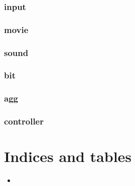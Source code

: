 \documentclass[letterpaper,10pt,english]{sphinxmanual}
\begin{document}
\subsection{input}
\label{\detokenize{mods:input}}\label{\detokenize{mods:id7}}

\subsection{movie}
\label{\detokenize{mods:movie}}\label{\detokenize{mods:id8}}

\subsection{sound}
\label{\detokenize{mods:sound}}\label{\detokenize{mods:id9}}

\subsection{bit}
\label{\detokenize{mods:bit}}\label{\detokenize{mods:id10}}

\subsection{agg}
\label{\detokenize{mods:agg}}\label{\detokenize{mods:id11}}

\subsection{controller}
\label{\detokenize{mods:controller}}\label{\detokenize{mods:id12}}

\chapter{Indices and tables}
\label{\detokenize{index:indices-and-tables}}\begin{itemize}
\item {} 
\sphinxAtStartPar
{}

\end{itemize}



\renewcommand{\indexname}{Index}
\printindex
\end{document}
